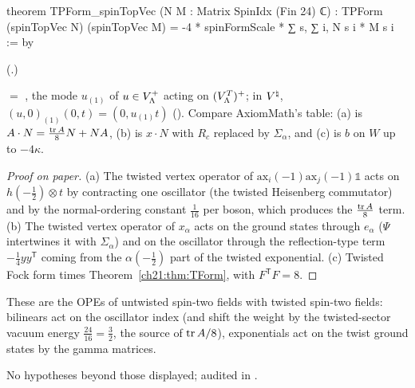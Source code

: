 \begin{leancode}
theorem TPForm_spinTopVec (N M : Matrix SpinIdx (Fin 24) ℂ) :
    TPForm (spinTopVec N) (spinTopVec M)
      = -4 * spinFormScale * ∑ s, ∑ i, N s i * M s i := by
\end{leancode}
(.)
\begin{dictionary}
 $=$ , the mode $u_{(1)}$ of $u\in V_{\Lambda}^+$ acting on
$(V_{\Lambda}^T)^+$; in ${V^{\natural}}$, $(u,0)_{(1)}(0,t)=(0,u_{(1)}t)$ ().
Compare AxiomMath's table: (a) is $A\cdot N=\tfrac{\operatorname{tr} A}8N+NA$, (b) is $x\cdot N$ with $R_c$ replaced by
$\Sigma_\alpha$, and (c) is $b$ on $W$ up to $-4\kappa$.
\end{dictionary}
\begin{proof}[Proof on paper]
(a) The twisted vertex operator of $\mathrm{ax}_i(-1)\mathrm{ax}_j(-1)\mathbb1$ acts on
$h(-\tfrac12)\otimes t$ by contracting one oscillator (the twisted Heisenberg commutator) and by the
normal-ordering constant $\tfrac1{16}$ per boson, which produces the $\tfrac{\operatorname{tr} A}8$ term.  (b) The twisted
vertex operator of $x_\alpha$ acts on the ground states through $e_\alpha$ ($\Psi$ intertwines it with $\Sigma_\alpha$)
and on the oscillator through the reflection-type term $-\tfrac14 yy^{\mathsf T}$ coming from the
$\alpha(-\tfrac12)$ part of the twisted exponential.  (c) Twisted Fock form times
Theorem~\ref{ch21:thm:TForm}, with $F^{\mathsf T}F=8$.
\end{proof}
\begin{physics}
These are the OPEs of untwisted spin-two fields with twisted spin-two fields: bilinears act on the
oscillator index (and shift the weight by the twisted-sector vacuum energy $\tfrac{24}{16}=\tfrac32$,
the source of $\operatorname{tr} A/8$), exponentials act on the twist ground states by the gamma matrices.
\end{physics}
\begin{status}
No hypotheses beyond those displayed; audited in .
\end{status}

